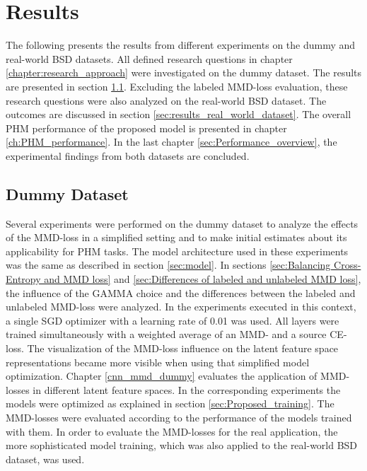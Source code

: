 \chapter{Results}\label{sec:results}

The following presents the results from different experiments on the dummy and real-world BSD datasets. All defined research questions in chapter \ref{chapter:research_approach} were investigated on the dummy dataset. The results are presented in section \ref{sec:results_dummy_dataset}. Excluding the labeled MMD-loss evaluation, these research questions were also analyzed on the real-world BSD dataset. The outcomes are discussed in section \ref{sec:results_real_world_dataset}. The overall PHM performance of the proposed model is presented in chapter \ref{ch:PHM_performance}. In the last chapter \ref{sec:Performance_overview}, the experimental findings from both datasets are concluded.




\section{Dummy Dataset}\label{sec:results_dummy_dataset}
Several experiments were performed on the dummy dataset to analyze the effects of the MMD-loss in a simplified setting and to make initial estimates about its applicability for PHM tasks. The model architecture used in these experiments was the same as described in section \ref{sec:model}. In sections \ref{sec:Balancing Cross-Entropy and MMD loss} and \ref{sec:Differences of labeled and unlabeled MMD loss}, the influence of the GAMMA choice and the differences between the labeled and unlabeled MMD-loss were analyzed. In the experiments executed in this context, a single SGD optimizer with a learning rate of 0.01 was used. All layers were trained simultaneously with a weighted average of an MMD- and a source CE-loss. The visualization of the MMD-loss influence on the latent feature space representations became more visible when using that simplified model optimization. Chapter \ref{cnn_mmd_dummy} evaluates the application of MMD-losses in different latent feature spaces. In the corresponding experiments the models were optimized as explained in section \ref{sec:Proposed_training}. The MMD-losses were evaluated according to the performance of the models trained with them. In order to evaluate the MMD-losses for the real application, the more sophisticated model training, which was also applied to the real-world BSD dataset, was used.


